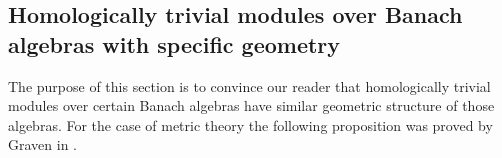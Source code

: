 \documentclass[12pt]{article}
\begin{document}

\subsection{Homologically trivial modules over Banach algebras with specific geometry}
\label{SubSectionHomologicallyTrivialModulesOverBanachAlgebrasWithSpecificGeometry}

The purpose of this section is to convince our reader that homologically trivial modules over certain Banach algebras have similar geometric structure of those algebras. For the case of metric theory the following proposition was proved by Graven in \cite{GravInjProjBanMod}.
\end{document}
